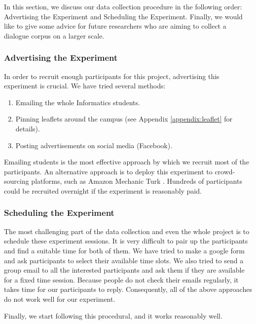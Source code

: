 \documentclass[bsc,frontabs,twoside,singlespacing,parskip,deptreport]{infthesis}     %
\begin{document}
In this section, we discuss our data collection procedure in the following order: Advertising the Experiment and Scheduling the Experiment. Finally, we would like to give some advice for future researchers who are aiming to collect a dialogue corpus on a larger scale.

\subsubsection*{Advertising the Experiment}

In order to recruit enough participants for this project, advertising this experiment is crucial. We have tried several methods:

\begin{enumerate}
   \item Emailing the whole Informatics students.

   \item Pinning leaflets around the campus (see Appendix \ref{appendix:leaflet} for details). 
 
   \item Posting advertisements on social media (Facebook).
\end{enumerate}

Emailing students is the most effective approach by which we recruit most of the participants. An alternative approach is to deploy this experiment to crowd-sourcing platforms, such as Amazon Mechanic Turk \cite{mturk}. Hundreds of participants could be recruited overnight if the experiment is reasonably paid.


\subsubsection*{Scheduling the Experiment}

The most challenging part of the data collection and even the whole project is to schedule these experiment sessions. It is very difficult to pair up the participants and find a suitable time for both of them. We have tried to make a google form and ask participants to select their available time slots. We also tried to send a group email to all the interested participants and ask them if they are available for a fixed time session. Because people do not check their emails regularly, it takes time for our participants to reply. Consequently, all of the above approaches do not work well for our experiment.

Finally, we start following this procedural, and it works reasonably well.
\end{document}
